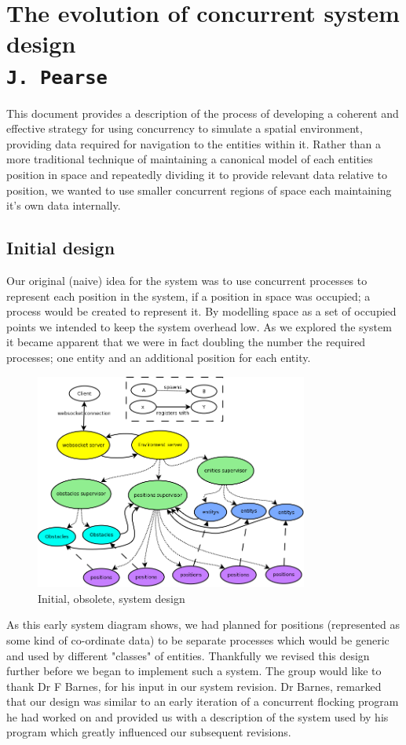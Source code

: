 \pagestyle{empty}

\section{The evolution of concurrent system design\\{\small\tt{J.~Pearse}}}
\label{system-design-document}
\label{system_evolution}
This document provides a description of the process of developing a coherent and effective strategy for using concurrency to simulate a spatial environment, providing data required for navigation to the entities within it.
Rather than a more traditional technique of maintaining a canonical model of each entities position in space and repeatedly dividing it to provide relevant data relative to position, we wanted to use smaller concurrent regions of space each maintaining it's own data internally.
\subsection{Initial design}
Our original (naive) idea for the system was to use concurrent processes to represent each position in the system, if a position in space was occupied; a process would be created to represent it. By modelling space as a set of occupied points we intended to keep the system overhead low. As we explored the system it became apparent that we were in fact doubling the number the required processes; one entity and an additional position for each entity.
\begin{figure}[h]
  \centering
  \includegraphics[width=0.8\textwidth]{img/HighLevelProcess.png}
\caption{Initial, obsolete, system design}
    \label{fig:Initial system design}
\end{figure}
As this early system diagram shows, we had planned for positions (represented as some kind of co-ordinate data) to be separate processes which would be generic and used by different "classes" of entities. Thankfully we revised this design further before we began to implement such a system.
The group would like to thank Dr F Barnes, for his input in our system revision. Dr Barnes, remarked that our design was similar to an early iteration of a concurrent flocking program he had worked on and provided us with a description of the system used by his program which greatly influenced our subsequent revisions.

